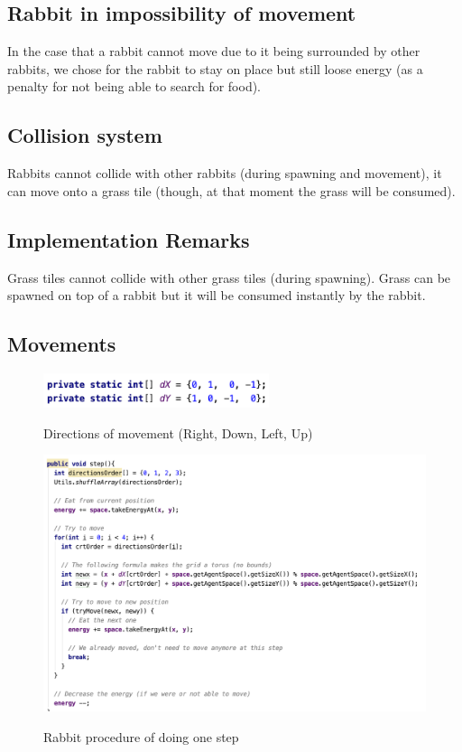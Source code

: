 \documentclass[11pt]{article}
\begin{document}
\subsection* {Rabbit in impossibility of movement}
In the case that a rabbit cannot move due to it being surrounded by other rabbits, we chose for the rabbit to stay on place but still loose energy (as a penalty for not being able to search for food).

\subsection* {Collision system}
Rabbits cannot collide with other rabbits (during spawning and movement), it can move onto a grass tile (though, at that moment the grass will be consumed).

\subsection{Implementation Remarks}
Grass tiles cannot collide with other grass tiles (during spawning). Grass can be spawned on top of a rabbit but it will be consumed instantly by the rabbit.

\subsection* {Movements}

\begin{figure}[H]
\includegraphics[width=0.59\textwidth]{rabbit-movement-1}
\centering
\label{fig:movement-directions}
\caption{ Directions of movement (Right, Down, Left, Up) }
\end{figure}

\begin{figure}[H]
\includegraphics[width=1.0\textwidth]{rabbit-movement-2}
\centering
\label{fig:movement-directions}
\caption{ Rabbit procedure of doing one step }
\end{figure}
\end{document}
